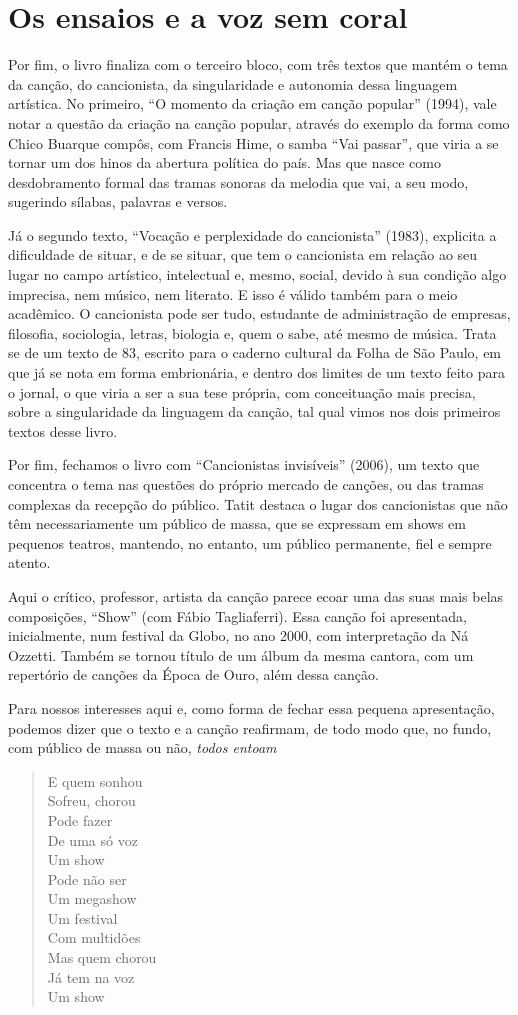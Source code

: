 \section{Os ensaios e a voz sem coral}

Por fim, o livro finaliza com o terceiro bloco, com três textos que
mantém o tema da canção, do cancionista, da singularidade e autonomia
dessa linguagem artística. No primeiro, ``O momento da criação em canção
popular'' (1994), vale notar a questão da criação na canção popular,
através do exemplo da forma como Chico Buarque compôs, com Francis Hime,
o samba ``Vai passar'', que viria a se tornar um dos hinos da abertura
política do país. Mas que nasce como desdobramento formal das tramas
sonoras da melodia que vai, a seu modo, sugerindo sílabas, palavras e
versos.

Já o segundo texto, ``Vocação e perplexidade do cancionista'' (1983),
explicita a dificuldade de situar, e de se situar, que tem o cancionista
em relação ao seu lugar no campo artístico, intelectual e, mesmo,
social, devido à sua condição algo imprecisa, nem músico, nem literato.
E isso é válido também para o meio acadêmico. O cancionista pode ser
tudo, estudante de administração de empresas, filosofia, sociologia,
letras, biologia e, quem o sabe, até mesmo de música. Trata se de um
texto de 83, escrito para o caderno cultural da Folha de São Paulo, em
que já se nota em forma embrionária, e dentro dos limites de um texto
feito para o jornal, o que viria a ser a sua tese própria, com
conceituação mais precisa, sobre a singularidade da linguagem da canção,
tal qual vimos nos dois primeiros textos desse livro.

Por fim, fechamos o livro com ``Cancionistas invisíveis'' (2006), um
texto que concentra o tema nas questões do próprio mercado de canções,
ou das tramas complexas da recepção do público. Tatit destaca o lugar
dos cancionistas que não têm necessariamente um público de massa, que se
expressam em shows em pequenos teatros, mantendo, no entanto, um público
permanente, fiel e sempre atento.

Aqui o crítico, professor, artista da canção parece ecoar uma das suas
mais belas composições, ``Show'' (com Fábio Tagliaferri). Essa canção
foi apresentada, inicialmente, num festival da Globo, no ano 2000, com
interpretação da Ná Ozzetti. Também se tornou título de um álbum da
mesma cantora, com um repertório de canções da Época de Ouro, além dessa
canção.

Para nossos interesses aqui e, como forma de fechar essa pequena
apresentação, podemos dizer que o texto e a canção reafirmam, de todo
modo que, no fundo, com público de massa ou não, \emph{todos entoam}

\begin{verse}
E quem sonhou\\
Sofreu, chorou\\
Pode fazer\\
De uma só voz\\
Um show\\
Pode não ser\\
Um megashow\\
Um festival\\
Com multidões\\
Mas quem chorou\\
Já tem na voz\\
Um show\\
\end{verse}

